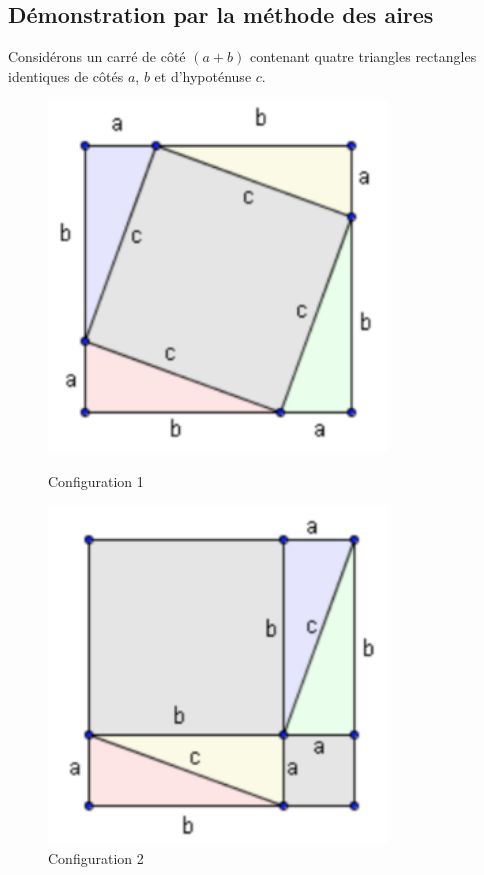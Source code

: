 \subsection{Démonstration par la méthode des aires}
Considérons un carré de côté $(a + b)$ contenant quatre triangles rectangles identiques de côtés $a$, $b$ et d'hypoténuse $c$.

\begin{figure}[h]
\centering
\begin{minipage}{0.45\textwidth}
    \centering
    \includegraphics[width=0.8\textwidth]{../../assets/images/4e/seq_02_pythagore/fig_demo_pythagore_config_1}
    \caption{Configuration 1}
    \label{fig:config1}
\end{minipage}
\hfill
\begin{minipage}{0.45\textwidth}
    \centering
    \includegraphics[width=0.8\textwidth]{../../assets/images/4e/seq_02_pythagore/fig_demo_pythagore_config_2.png}
    \caption{Configuration 2}
    \label{fig:config2}
\end{minipage}
\end{figure}

